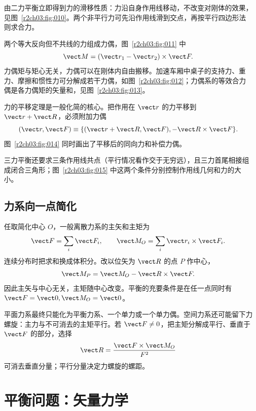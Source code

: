 由二力平衡立即得到力的滑移性质：力沿自身作用线移动，不改变对刚体的效果，见图~\ref{r2ch03:fig:010}。两个非平行力可先沿作用线滑到交点，再按平行四边形法则求合力。
\figForceSliding

两个等大反向但不共线的力组成力偶，图~\ref{r2ch03:fig:011} 中
\begin{equation}
 \vect M=(\vect r_1-\vect r_2)\times\vect F .
 \label{r2ch03:eq:012}
\end{equation}
力偶矩与矩心无关，力偶可以在刚体内自由搬移。加速车厢中桌子的支持力、重力、摩擦和惯性力可分解成若干力偶，如图~\ref{r2ch03:fig:012}；力偶系的等效合力偶是各力偶矩的矢量和，见图~\ref{r2ch03:fig:013}。
\figCouple
\figAcceleratingTable
\figCoupleSum

力的平移定理是一般化简的核心。把作用在 $\vect r$ 的力平移到 $\vect r+\vect R$，必须附加力偶
\begin{equation}
 (\vect r,\vect F)\equiv
 \{(\vect r+\vect R,\vect F),-\vect R\times\vect F\}.
 \label{r2ch03:eq:013}
\end{equation}
图~\ref{r2ch03:fig:014} 同时画出了平移后的同向力和补偿力偶。
\figForceTranslation

三力平衡还要求三条作用线共点（平行情况看作交于无穷远），且三力首尾相接组成闭合三角形；图~\ref{r2ch03:fig:015} 中这两个条件分别控制作用线几何和力的大小。
\figThreeForceTriangle

\subsection{力系向一点简化}

任取简化中心 $O$，一般离散力系的主矢和主矩为
\begin{equation}
 \vect F=\sum_i\vect F_i,\qquad
 \vect M_O=\sum_i\vect r_i\times\vect F_i .
 \label{r2ch03:eq:014}
\end{equation}
连续分布时把求和换成体积分。改以位矢为 $\vect R$ 的点 $P$ 作中心，
\begin{equation}
 \vect M_P=\vect M_O-\vect R\times\vect F .
 \label{r2ch03:eq:015}
\end{equation}
因此主矢与中心无关，主矩随中心改变。平衡的充要条件是在任一点同时有 $\vect F=\vect0,\vect M_O=\vect0$。

平面力系最终只能化为平衡力系、一个单力或一个单力偶。空间力系还可能留下力螺旋：主力与不可消去的主矩平行。若 $\vect F\ne0$，把主矩分解成平行、垂直于 $\vect F$ 的部分，选择
\[
 \vect R=\frac{\vect F\times\vect M_O}{F^2}
\]
可消去垂直分量；平行分量决定力螺旋的螺距。

\section{平衡问题：矢量力学}
\label{r2ch03:sec:vector-statics}

